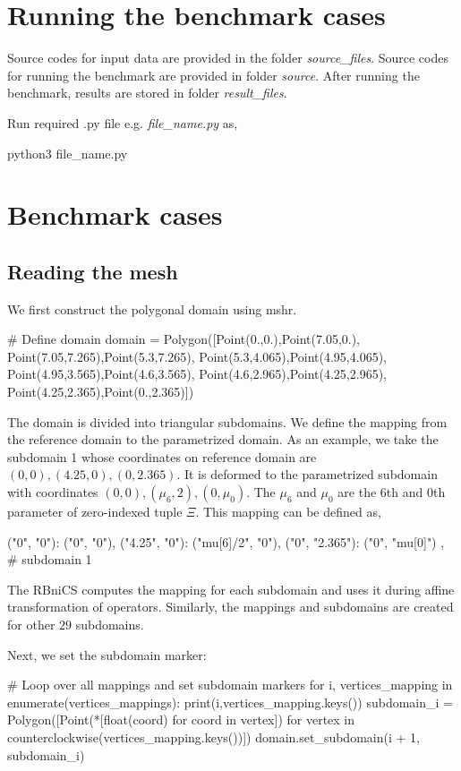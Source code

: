 \section{Running the benchmark cases}

Source codes for input data are provided in the folder \emph{source\_files}. Source codes for running the benchmark are provided in folder \emph{source}. After running the benchmark, results are stored in folder \emph{result\_files}.

Run required .py file e.g. \emph{file\_name.py} as,
\begin{python}
python3 file_name.py
\end{python}

\section{Benchmark cases}

\subsection{Reading the mesh}

We first construct the polygonal domain using mshr.
\begin{python}
# Define domain
domain = Polygon([Point(0.,0.),Point(7.05,0.),
				Point(7.05,7.265),Point(5.3,7.265),
				Point(5.3,4.065),Point(4.95,4.065),
				Point(4.95,3.565),Point(4.6,3.565),
				Point(4.6,2.965),Point(4.25,2.965),
				Point(4.25,2.365),Point(0.,2.365)])
\end{python}

The domain is divided into triangular subdomains. We define the mapping from the reference domain to the parametrized domain. As an example, we take the subdomain 1 whose coordinates on reference domain are $(0,0),(4.25,0),(0,2.365)$. It is deformed to the parametrized subdomain with coordinates $(0,0),(\mu_6,2),(0,\mu_0)$. The $\mu_6$ and $\mu_0$ are the $6$th and $0$th parameter of zero-indexed tuple $\Xi$. This mapping can be defined as,
\begin{python}
	{
		("0", "0"): ("0", "0"),
		("4.25", "0"): ("mu[6]/2", "0"),
		("0", "2.365"): ("0", "mu[0]")
	}, # subdomain 1
\end{python}

The RBniCS computes the mapping for each subdomain and uses it during affine transformation of operators. Similarly, the mappings and subdomains are created for other $29$ subdomains.

Next, we set the subdomain marker:
\begin{python}
# Loop over all mappings and set subdomain markers
for i, vertices_mapping in enumerate(vertices_mappings):
	print(i,vertices_mapping.keys())
	subdomain_i = Polygon([Point(*[float(coord) for coord in vertex]) for vertex in counterclockwise(vertices_mapping.keys())])
	domain.set_subdomain(i + 1, subdomain_i)
\end{python}

